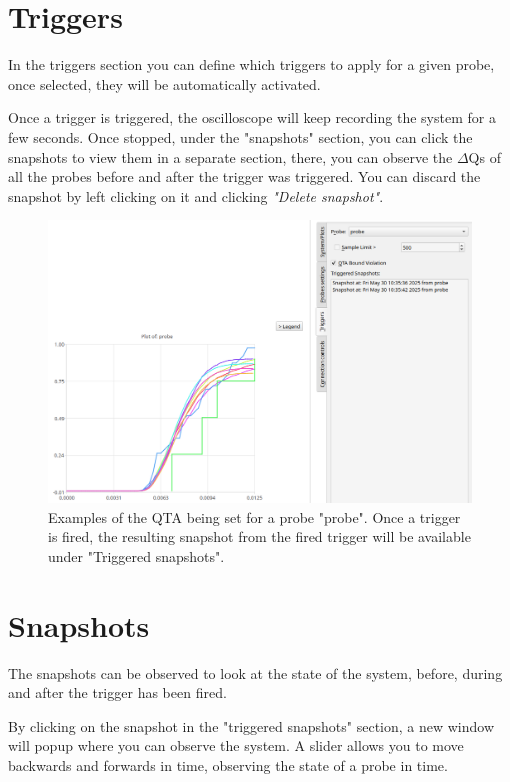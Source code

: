 \section{Triggers}
    In the triggers section you can define which triggers to apply for a given probe, once selected, they will be automatically activated.

    Once a trigger is triggered, the oscilloscope will keep recording the system for a few seconds. Once stopped, under the "snapshots" section, you can click the snapshots to view them in a separate section, there, you can observe the $\Delta$Qs of all the probes before and after the trigger was triggered. You can discard the snapshot by left clicking on it and clicking \textit{"Delete snapshot"}.

     \begin{figure}[H]
        \begin{center}
        \includegraphics[width = \textwidth]{img/manual/triggers.png}
        \end{center}
        \caption{Examples of the QTA being set for a probe "probe". Once a trigger is fired, the resulting snapshot from the fired trigger will be available under "Triggered snapshots".}
    \end{figure}

\section{Snapshots}
    The snapshots can be observed to look at the state of the system, before, during and after the trigger has been fired.

    By clicking on the snapshot in the "triggered snapshots" section, a new window will popup where you can observe the system. A slider allows you to move backwards and forwards in time, observing the state of a probe in time.
 
